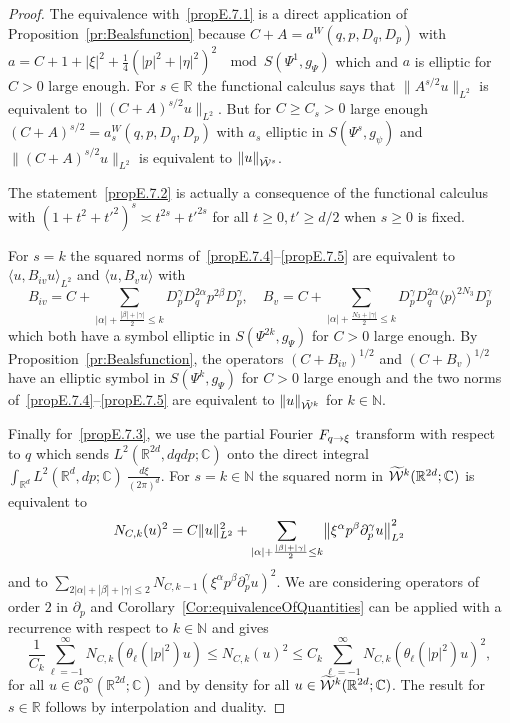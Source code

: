 \documentclass[AHL,Unicode,longabstracts]{cedram}
\newcommand{\C}{\mathbb{C}}
\newcommand{\R}{\mathbb{R}}
\newcommand{\N}{\mathbb{N}}
\newcommand{\clW}{\mathcal{W}}
\newcommand{\clC}{\mathcal{C}}
\let\oldtilde\tilde
\renewcommand*{\tilde}[1]{\mathchoice{\widetilde{#1}}{\widetilde{#1}}{\oldtilde{#1}}{\oldtilde{#1}}}
\let\originalleft\left
\let\originalright\right
\renewcommand{\left}{\mathopen{}\mathclose\bgroup\originalleft}
\renewcommand{\right}{\aftergroup\egroup\originalright}
\renewcommand*{\to}{\mathchoice{\longrightarrow}{\rightarrow}{\rightarrow}{\rightarrow}}
\begin{document}
\begin{proof}
The equivalence with~\eqref{propE.7.1} is a direct application of Proposition~\ref{pr:Bealsfunction} because $C+A=a^{W}(q,p,D_{q},D_{p})$ with $a=C+1+|\xi|^{2}+\frac{1}{4}(|p|^{2}+|\eta|^{2})^{2}~\mod S(\Psi^{1},g_{\Psi})$ which and $a$ is elliptic for $C>0$ large enough. For $s\in \R$ the functional calculus says that $\|A^{s/2}u\|_{L^{2}}$ is equivalent to $\|(C+A)^{s/2}u\|_{L^{2}}$. But for $C\geq C_{s}>0$ large enough $(C+A)^{s/2}=a_{s}^{W}(q,p,D_{q},D_{p})$ with $a_{s}$ elliptic in $S(\Psi^{s},g_{\psi})$ and $\|(C+A)^{s/2}u\|_{L^{2}}$ is equivalent to $\|u\|_{\tilde{\clW}^{s}}$.

The statement~\eqref{propE.7.2} is actually a consequence of the functional calculus with $(1+t^2+{t'}^2)^{s}\asymp t^{2s}+{t'}^{2s}$ for all $t\geq 0, t'\geq d/2$ when $s\geq 0$ is fixed.

For $s=k$ the squared norms of~\eqref{propE.7.4}--\eqref{propE.7.5} are equivalent to $\langle u, B_{iv}u\rangle_{L^{2}}$ and $\langle u, B_{v}u\rangle$ with
\[
B_{iv}=C+\sum_{|\alpha|+\frac{|\beta|+|\gamma|}{2}\leq k}D_{p}^{\gamma}D_{q}^{2\alpha}p^{2\beta}D_{p}^{\gamma},\quad B_{v}=C+\sum_{|\alpha|+\frac{N_{3}+|\gamma|}{2}\leq k}D_{p}^{\gamma}D_{q}^{2\alpha}\langle p\rangle^{2N_{3}}D_{p}^{\gamma}
\]
which both have a symbol elliptic in $S(\Psi^{2k},g_{\Psi})$ for $C>0$ large enough. By Proposition~\ref{pr:Bealsfunction}, the operators $(C+B_{iv})^{1/2}$ and $(C+B_{v})^{1/2}$ have an elliptic symbol in $S(\Psi^{k},g_{\Psi})$ for $C>0$ large enough and the two norms of~\eqref{propE.7.4}--\eqref{propE.7.5} are equivalent to $\|u\|_{\tilde{\clW}^{k}}$ for $k\in \N$.

Finally for~\eqref{propE.7.3}, we use the partial Fourier $F_{q\to\xi}$ transform with respect to $q$ which sends $L^{2}(\R^{2d},dqdp;\C)$ onto the direct integral $\int_{\R^{d}}L^{2}(\R^{d},dp;\C)~\frac{d\xi}{(2\pi)^{d}}$. For $s=k\in\N$ the squared norm in $\tilde{\clW}^{k}(\R^{2d};\C)$ is equivalent to
\[
N_{C,k}(u)^{2}=C\|u\|_{L^{2}}^{2}+\sum_{|\alpha|+\frac{|\beta|+|\gamma|}{2}\leq k}\left\|\xi^{\alpha}p^{\beta}\partial_{p}^{\gamma}u\right\|_{L^{2}}^{2}
\]
and to $\sum_{2|\alpha|+|\beta|+|\gamma|\leq 2}N_{C,k-1}(\xi^{\alpha}p^{\beta}\partial_{p}^{\gamma}u)^{2}$. We are considering operators of order $2$ in $\partial_{p}$ and Corollary~\ref{Cor:equivalenceOfQuantities} can be applied with a recurrence with respect to $k\in \N$ and gives
\[
\frac{1}{C_{k}}\sum_{\ell=-1}^{\infty}N_{C,k}(\theta_{\ell}(|p|^{2})u)\leq N_{C,k}(u)^{2}\leq C_{k}\sum_{\ell=-1}^{\infty}N_{C,k}(\theta_{\ell}(|p|^{2})u)^{2},
\]
for all $u\in \clC^{\infty}_{0}(\R^{2d};\C)$ and by density for all $u\in \tilde{\clW}^{k}(\R^{2d};\C)$. The result for $s\in \R$ follows by interpolation and duality.
\end{proof}
\end{document}
